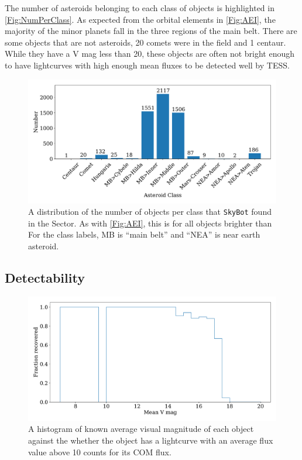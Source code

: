 \documentclass{UCreport}
\begin{document}
The number of asteroids belonging to each class of objects is highlighted in \autoref{Fig:NumPerClass}. As expected from the orbital elements in \autoref{Fig:AEI}, the majority of the minor planets fall in the three regions of the main belt. 
There are some objects that are not asteroids, 20 comets were in the field and 1 centaur.
While they have a V mag less than 20, these objects are often not bright enough to have lightcurves with high enough mean fluxes to be detected well by TESS.
 

\begin{figure}
  \centering
  \includegraphics[width=\textwidth]{../OzData/classesBar29.pdf}
  \caption[Class distribution]{A distribution of the number of objects per class that \texttt{SkyBot} found in the Sector. 
  As with \autoref{Fig:AEI}, this is for all objects brighter than \unit{\mag}
  For the class labels, MB is ``main belt'' and ``NEA'' is near earth asteroid.}
  \label{Fig:NumPerClass}
\end{figure}

\subsection{Detectability}

\begin{figure}
  \centering
  \includegraphics[width=\textwidth]{../OzData/recoverdHistBkgLimof10.pdf}
  \caption[Recovery plot]{A histogram of known average visual magnitude of each object against the whether the object has a lightcurve with an average flux value above 10 %
  counts for its COM flux.
  }
  \label{Fig:RecovOverBkg}
\end{figure}
\end{document}
